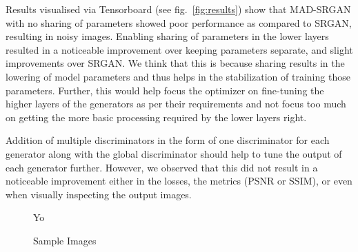 \documentclass[12pt,a4paper,twocolumn]{article}
\begin{document}
        Results visualised via Tensorboard \cite{tensorflow} (see fig.~\ref{fig:results}) show that MAD-SRGAN with no sharing of parameters showed poor performance as compared to SRGAN, resulting in noisy images.
        Enabling sharing of parameters in the lower layers resulted in a noticeable improvement over keeping parameters separate, and slight improvements over SRGAN.
        We think that this is because sharing results in the lowering of model parameters and thus helps in the stabilization of training those parameters.
        Further, this would help focus the optimizer on fine-tuning the higher layers of the generators as per their requirements and not focus too much on getting the more basic processing required by the lower layers right.

        Addition of multiple discriminators in the form of one discriminator for each generator along with the global discriminator should help to tune the output of each generator further.
        However, we observed that this did not result in a noticeable improvement either in the losses, the metrics (PSNR or SSIM), or even when visually inspecting the output images.

        \begin{figure}
            \centering
            Yo
            \caption{Sample Images}
            \label{fig:samples}
        \end{figure}

    
    
\end{document}
